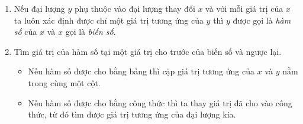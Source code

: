 \begin{dang}
\begin{enumerate}[\tickEX]
	\item Nếu đại lượng $y$ phụ thuộc vào đại lượng thay đổi $x$ và với mỗi giá trị của $x$ ta luôn xác định được chỉ một giá trị tương ứng của $y$ thì $y$ được gọi là \textit{hàm số} của $x$ và $x$ gọi là \textit{biến số}.
	\item Tìm giá trị của hàm số tại một giá trị cho trước của biến số và ngược lại.
\begin{itemize}
\item Nếu hàm số được cho bằng bảng thì cặp giá trị tương ứng của $x$ và $y$ nằm trong cùng một cột.
\item Nếu hàm số được cho bằng công thức thì ta thay giá trị đã cho vào công thức, từ đó tìm được giá trị tương ứng của đại lượng kia.
\end{itemize}
\end{enumerate}
\end{dang}
